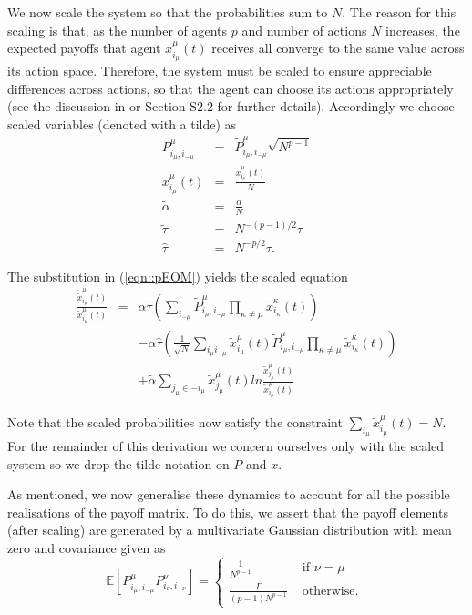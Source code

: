 \documentclass[sigconf,anonymous]{aamas}
\newcommand{\xmu}[2]{x_{#1_#2}^{#2}(t)}
\newcommand{\payoff}[2]{P^{#2}_{#1_#2, #1_{-#2}}}
\newcommand{\txmu}[2]{\tilde{x}_{#1_#2}^{#2}(t)}
\newcommand{\dtxmu}[2]{\dot{\tilde{x}}_{#1_#2}^{#2}(t)}
\newcommand{\tpayoff}[2]{\tilde{P}^{#2}_{#1_#2, #1_{-#2}}}
\newcommand{\talpha}{\tilde{\alpha}}
\newcommand{\ttau}{\tilde{\tau}}
\newcommand{\htau}{\hat{\tau}}
\begin{document}
We now scale the system so that the probabilities sum to $N$. The
reason for this scaling is that, as the number of agents $p$ and
number of actions $N$ increases, the expected payoffs that agent
$\xmu{i}{\mu}$ receives all converge to the same value across its action
space. Therefore, the system must be scaled to ensure appreciable
differences across actions, so that the agent can choose its actions
appropriately (see the discussion in \cite{Sanders2018} or
Section S2.2 for further details). Accordingly we choose
scaled variables (denoted with a tilde) as
%
\begin{eqnarray*}
        \payoff{i}{\mu} & = & \tpayoff{i}{\mu} \sqrt{N^{p-1}}\\
        \xmu{i}{\mu} & = & \frac{\txmu{i}{\mu}}{N} \\
        \talpha & = & \frac{\alpha}{N} \\
        \ttau & = & N^{-(p-1)/2} \tau \\
        \htau & = & N^{-p/2} \tau.
\end{eqnarray*}

The substitution in (\ref{eqn::pEOM}) yields the scaled equation
%
\begin{eqnarray}
    \frac{\dtxmu{i}{\mu}}{\txmu{i}{\mu}} & = & \alpha \ttau \left ( \sum_{i_{-\mu}} \tpayoff{i}{\mu} \prod_{\kappa \neq \mu} \txmu{i}{\kappa} \right ) \nonumber \\ & &  - \alpha \htau \left ( \frac{1}{\sqrt{N}} \sum_{i_\mu i_{-\mu}} \txmu{i}{\mu} \tpayoff{i}{\mu} \prod_{\kappa \neq \mu} \txmu{i}{\kappa} \right ) \nonumber  \\  & & + \talpha \sum_{j_\mu \in -i_\mu} \txmu{j}{\mu} ln \frac{\txmu{j}{\mu}}{\txmu{i}{\mu}}    \label{eqn::scaledEOM}
\end{eqnarray}

Note that the scaled probabilities now satisfy the constraint
$\sum_{i_\mu} \txmu{i}{\mu} = N$. For the remainder of this derivation
we concern ourselves only with the scaled system so we drop the tilde
notation on $P$ and $x$.

As mentioned, we now
generalise these dynamics to account for all the possible realisations
of the payoff matrix. To do this, we assert that the payoff elements
(after scaling) are generated by a multivariate Gaussian distribution
with mean zero and covariance given as
%
\begin{equation}
\label{eqn::Payoffs}
        \mathbb{E}\left [ \payoff{i}{\mu} \payoff{i}{\nu} \right] = \begin{cases}
        \frac{1}{N^{p-1}} &  \text{ if } \nu = \mu \\
        \frac{\Gamma}{(p-1) N^{p-1}} & \text{ otherwise. }
        \end{cases}
\end{equation}
\end{document}
